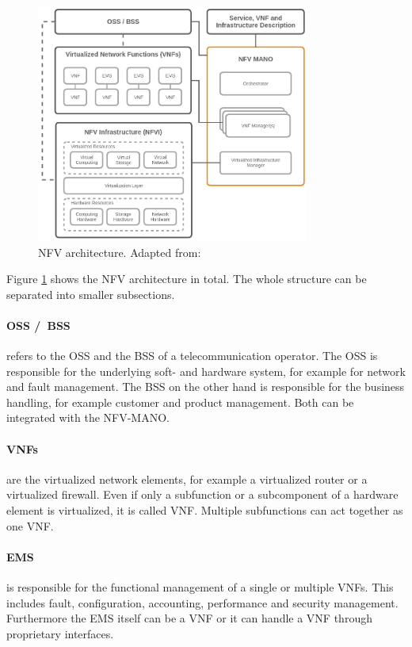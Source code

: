 \begin{figure}[H]
    \centering
    \includegraphics[width=0.8\textwidth]{resources/images/nfv_architecture.png}
    \caption[NFV architecture]{NFV architecture. Adapted from: \autocite{NFV:Architecture}}
    \label{fig:nfv_architecture}
\end{figure}

Figure \ref{fig:nfv_architecture} shows the \ac{NFV} architecture in total.
The whole structure can be separated into smaller subsections.

\paragraph{\acs{OSS} /\ \acs{BSS}} refers to the \ac{OSS} and the \ac{BSS} of a telecommunication operator.\autocite[cf.]{Kahn:2015}
The \ac{OSS} is responsible for the underlying soft- and hardware system, for example for network and fault management.
The \ac{BSS} on the other hand is responsible for the business handling, for example customer and product management.
Both can be integrated with the \ac{NFV-MANO}.\autocite[cf.]{Kahn:2015}

\paragraph{\acp{VNF}} are the virtualized network elements, for example a virtualized router or a virtualized firewall.
Even if only a subfunction or a subcomponent of a hardware element is virtualized, it is called \ac{VNF}.\autocite[cf.]{Kahn:2015}
Multiple subfunctions can act together as one \ac{VNF}.

\paragraph{\ac{EMS}} is responsible for the functional management of a single or multiple \acp{VNF}.\autocite[cf.]{Kahn:2015}
This includes fault, configuration, accounting, performance and security management.\autocite[cf.]{Kahn:2015}
Furthermore the \ac{EMS} itself can be a \ac{VNF} or it can handle a \ac{VNF} through proprietary interfaces.\autocite[cf.]{Kahn:2015}

